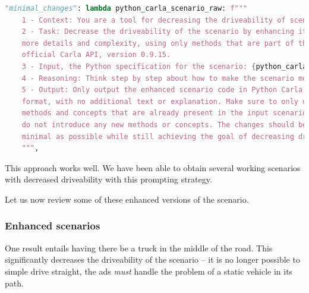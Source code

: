 \begin{lstlisting}[language=python, label={lst:minimalChangesPrompt}, caption={A prompt instructing the \acrshort{llm} to make as few changes as possible to increase the likelyhood of it working without issues.}]
        "minimal_changes": lambda python_carla_scenario_raw: f"""
    1 - Context: You are a tool for decreasing the driveability of scenarios in the driving simulator Carla.
    2 - Task: Decrease the driveability of the scenario by enhancing it with
    more details and complexity, using only methods that are part of the
    official Carla API, version 0.9.15.
    3 - Input, the Python specification for the scenario: {python_carla_scenario_raw}
    4 - Reasoning: Think step by step about how to make the scenario more complex and less driveable, considering possible obstacles, traffic, weather, and other factors using only the official Carla API.
    5 - Output: Only output the enhanced scenario code in Python Carla scenario
    format, with no additional text or explanation. Make sure to only use
    methods and concepts that are already present in the input scenario, and
    do not introduce any new methods or concepts. The changes should be as
    minimal as possible while still achieving the goal of decreasing driveability.
    """,
\end{lstlisting}

This approach works well. We have been able to obtain several working scenarios with decreased
driveability with this prompting strategy.

Let us now review some of these enhanced versions of the scenario.

\subsubsection{Enhanced scenarios}

One result entails having there be a truck in the middle of the road. This significantly decreases
the driveability of the scenario -- it is no longer possible to simple drive straight, the
\acrshort{ads} \emph{must} handle the problem of a static vehicle in its path.


